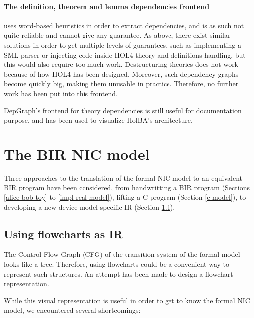\documentclass[10pt,a4paper]{article}
\begin{document}
\begin{multicols}{2}
\paragraph{The definition, theorem and lemma dependencies frontend} uses word-based heuristics in order to extract dependencies, and is as such not quite reliable and cannot give any guarantee. As above, there exist similar solutions in order to get multiple levels of guarantees, such as implementing a SML parser or injecting code inside HOL4 theory and definitions handling, but this would also require too much work. Destructuring theories does not work because of how HOL4 has been designed. Moreover, such dependency graphs become quickly big, making them unusable in practice. Therefore, no further work has been put into this frontend.

\medskip
DepGraph's frontend for theory dependencies is still useful for documentation purpose, and has been used to visualize HolBA's architecture.


\section{The BIR NIC model} \label{nic-model}

Three approaches to the translation of the formal NIC model to an equivalent BIR program have been considered, from handwritting a BIR program (Sections \ref{alice-bob-toy} to \ref{impl-real-model}), lifting a C program (Section \ref{c-model}), to developing a new device-model-specific IR (Section \ref{flowchart-attempt}).

\subsection{Using flowcharts as IR} \label{flowchart-attempt}

The Control Flow Graph ({CFG}) of the transition system of the formal model looks like a tree. Therefore, using flowcharts could be a convenient way to represent such structures. An attempt has been made to design a flowchart representation.

While this visual representation is useful in order to get to know the formal NIC model, we encountered several shortcomings:


\end{multicols}
\end{document}
